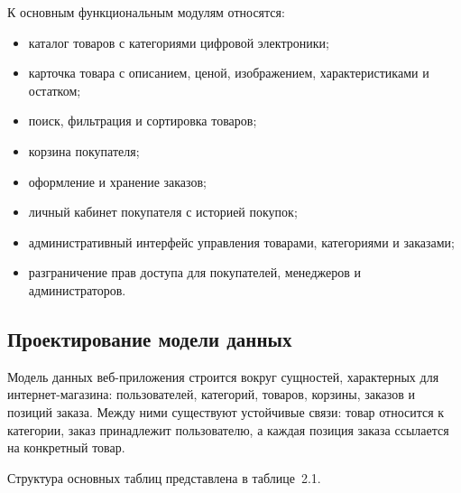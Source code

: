 К основным функциональным модулям относятся:
\begin{itemize}
    \item каталог товаров с категориями цифровой электроники;
    \item карточка товара с описанием, ценой, изображением, характеристиками и остатком;
    \item поиск, фильтрация и сортировка товаров;
    \item корзина покупателя;
    \item оформление и хранение заказов;
    \item личный кабинет покупателя с историей покупок;
    \item административный интерфейс управления товарами, категориями и заказами;
    \item разграничение прав доступа для покупателей, менеджеров и администраторов.
\end{itemize}

\subsection{Проектирование модели данных}

Модель данных веб-приложения строится вокруг сущностей, характерных для интернет-магазина:
пользователей, категорий, товаров, корзины, заказов и позиций заказа. Между ними существуют
устойчивые связи: товар относится к категории, заказ принадлежит пользователю, а каждая
позиция заказа ссылается на конкретный товар.

Структура основных таблиц представлена в таблице~2.1.

